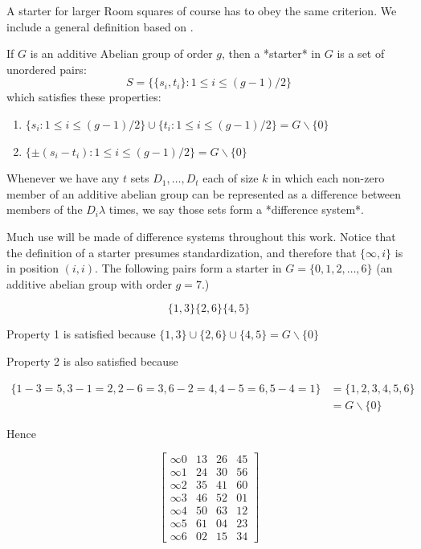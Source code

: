 \documentclass[
  11pt,
  a4paper]{book}\usepackage[]{graphicx}\usepackage[]{xcolor}
\begin{document}
A starter for larger Room squares of course has to obey the same
criterion. We include a general definition based on
\cite{dinitzContemporaryDesignTheory1992}.

If $G$ is an additive Abelian group of order $g$, then a
*starter* in $G$ is a set of unordered pairs:
$$S = \{\{s_i, t_i\}:1 \leq i \leq (g - 1)/2\}$$
which satisfies these properties:

\begin{enumerate}
  \item{$\{s_i:1 \leq i \leq (g-1)/2\} \cup \{t_i : 1 \leq i \leq (g-1)/2\} = G \backslash \{0\}$}
  \item{$\{\pm (s_i - t_i ) : 1 \leq i \leq (g-1)/2 \} = G \backslash \{0\}$}
\end{enumerate}

Whenever we have any $t$ sets $D_1, \ldots, D_t$ each of
size $k$ in which each non-zero member of an additive
abelian group can be represented as a difference between
members of the $D_i \lambda$ times, we say those sets form a
*difference system*.

Much use will be made of difference systems throughout this
work. Notice that the definition of a starter presumes
standardization, and therefore that $\{\infty, i\}$ is in
position $(i, i)$. The following pairs form a starter in
$G = \{0, 1, 2, \ldots, 6\}$ (an additive abelian group with
order $g = 7$.)

\begin{equation}
\{1,3\} \{2,6\} \{4,5\}
\end{equation}

Property 1 is satisfied because
$\{1,3\} \cup \{2,6\} \cup \{4,5\} = G \backslash \{0\}$

Property 2 is also satisfied because

\begin{equation}
\begin{split}
\{1 - 3 = 5, 3 - 1 = 2, 2 - 6 = 3, 6 - 2 = 4, 4 - 5 = 6, 5 - 4 = 1\} &= \{1, 2, 3, 4, 5, 6\} \\
 &= G\backslash \{0\}
\end{split}
\end{equation}

Hence

\begin{equation}
  \begin{bmatrix}
    \infty 0 &  13 &  26 &  45 \\
    \infty 1 &  24 &  30 &  56 \\
    \infty 2 &  35 &  41 &  60 \\
    \infty 3 &  46 &  52 &  01 \\
    \infty 4 &  50 &  63 &  12 \\
    \infty 5 &  61 &  04 &  23 \\
    \infty 6 &  02 &  15 &  34
  \end{bmatrix}
  \label{eq:starter}
\end{equation}
\end{document}
